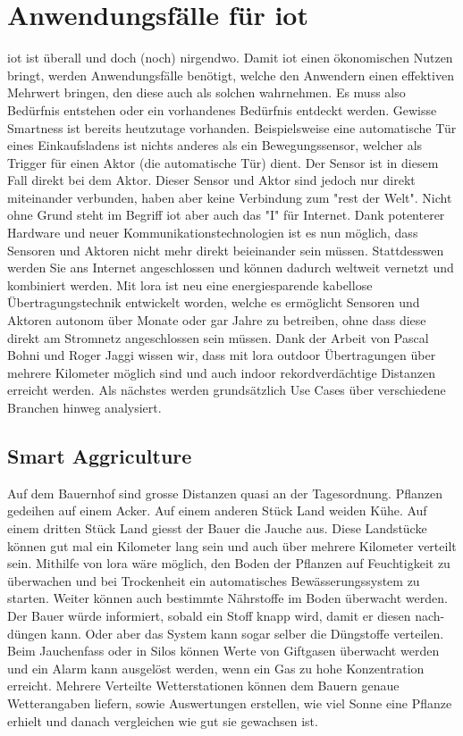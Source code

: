 \chapter{Anwendungsfälle für \gls{iot}}\label{Anwendungsfälle für IoT}

\gls{iot} ist überall und doch (noch) nirgendwo. Damit \gls{iot} einen ökonomischen Nutzen bringt, werden Anwendungsfälle benötigt, welche den Anwendern einen effektiven Mehrwert bringen, den diese auch als solchen wahrnehmen. Es muss also Bedürfnis entstehen oder ein vorhandenes Bedürfnis entdeckt werden. Gewisse \glqq{}Smartness\grqq{} ist bereits heutzutage vorhanden. Beispielsweise eine automatische Tür eines Einkaufsladens ist nichts anderes als ein Bewegungssensor, welcher als Trigger für einen Aktor (die automatische Tür) dient. Der Sensor ist in diesem Fall direkt bei dem Aktor. Dieser Sensor und Aktor sind jedoch nur direkt miteinander verbunden, haben aber keine Verbindung zum "rest der Welt".
Nicht ohne Grund steht im Begriff \gls{iot} aber auch das "I" für Internet. Dank potenterer Hardware und neuer Kommunikationstechnologien ist es nun möglich, dass Sensoren und Aktoren nicht mehr direkt beieinander sein müssen. Stattdesswen werden Sie ans Internet angeschlossen und können dadurch weltweit vernetzt und kombiniert werden. Mit \gls{lora} ist neu eine energiesparende kabellose Übertragungstechnik entwickelt worden, welche es ermöglicht Sensoren und Aktoren autonom über Monate oder gar Jahre zu betreiben, ohne dass diese direkt am Stromnetz angeschlossen sein müssen. Dank der Arbeit von Pascal Bohni und Roger Jaggi \autocite[29]{bfh:optimizedDataTransmission} wissen wir, dass mit \gls{lora} outdoor Übertragungen über mehrere Kilometer möglich sind und auch indoor rekordverdächtige Distanzen erreicht werden. Als nächstes werden grundsätzlich Use Cases über verschiedene Branchen hinweg analysiert.


\section{Smart Aggriculture}
Auf dem Bauernhof sind grosse Distanzen quasi an der Tagesordnung. Pflanzen gedeihen auf einem Acker. Auf einem anderen Stück Land weiden Kühe. Auf einem dritten Stück Land giesst der Bauer die Jauche aus. Diese Landstücke können gut mal ein Kilometer lang sein und auch über mehrere Kilometer verteilt sein. Mithilfe von \gls{lora} wäre möglich, den Boden der Pflanzen auf Feuchtigkeit zu überwachen und bei Trockenheit ein automatisches Bewässerungssystem zu starten. Weiter können auch bestimmte Nährstoffe im Boden überwacht werden. Der Bauer würde informiert, sobald ein Stoff knapp wird, damit er diesen nach-düngen kann. Oder aber das System kann sogar selber die Düngstoffe verteilen. Beim Jauchenfass oder in Silos können Werte von Giftgasen überwacht werden und ein Alarm kann ausgelöst werden, wenn ein Gas zu hohe Konzentration erreicht. Mehrere Verteilte Wetterstationen können dem Bauern genaue Wetterangaben liefern, sowie Auswertungen erstellen, wie viel Sonne eine Pflanze erhielt und danach vergleichen wie gut sie gewachsen ist.


